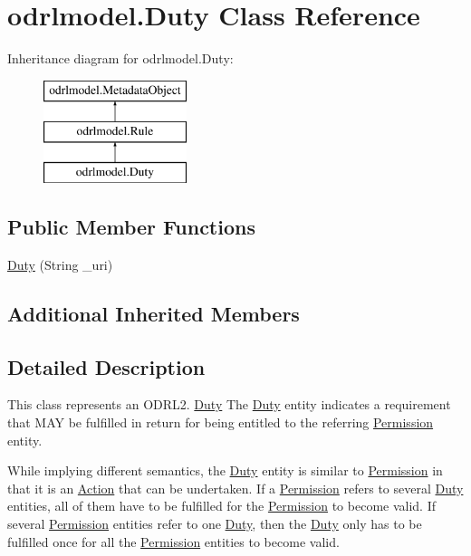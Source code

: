 \hypertarget{classodrlmodel_1_1_duty}{\section{odrlmodel.\-Duty Class Reference}
\label{classodrlmodel_1_1_duty}
}
Inheritance diagram for odrlmodel.\-Duty\-:\begin{figure}[H]
\begin{center}
\leavevmode
\includegraphics[height=3.000000cm]{classodrlmodel_1_1_duty}
\end{center}
\end{figure}
\subsection*{Public Member Functions}
\begin{DoxyCompactItemize}
\item 
\hyperlink{classodrlmodel_1_1_duty_a9451204912dfac8559df1489573a7776}{Duty} (String \-\_\-uri)
\end{DoxyCompactItemize}
\subsection*{Additional Inherited Members}


\subsection{Detailed Description}
This class represents an O\-D\-R\-L2. \hyperlink{classodrlmodel_1_1_duty}{Duty} The \hyperlink{classodrlmodel_1_1_duty}{Duty} entity indicates a requirement that M\-A\-Y be fulfilled in return for being entitled to the referring \hyperlink{classodrlmodel_1_1_permission}{Permission} entity.

While implying different semantics, the \hyperlink{classodrlmodel_1_1_duty}{Duty} entity is similar to \hyperlink{classodrlmodel_1_1_permission}{Permission} in that it is an \hyperlink{classodrlmodel_1_1_action}{Action} that can be undertaken. If a \hyperlink{classodrlmodel_1_1_permission}{Permission} refers to several \hyperlink{classodrlmodel_1_1_duty}{Duty} entities, all of them have to be fulfilled for the \hyperlink{classodrlmodel_1_1_permission}{Permission} to become valid. If several \hyperlink{classodrlmodel_1_1_permission}{Permission} entities refer to one \hyperlink{classodrlmodel_1_1_duty}{Duty}, then the \hyperlink{classodrlmodel_1_1_duty}{Duty} only has to be fulfilled once for all the \hyperlink{classodrlmodel_1_1_permission}{Permission} entities to become valid.

